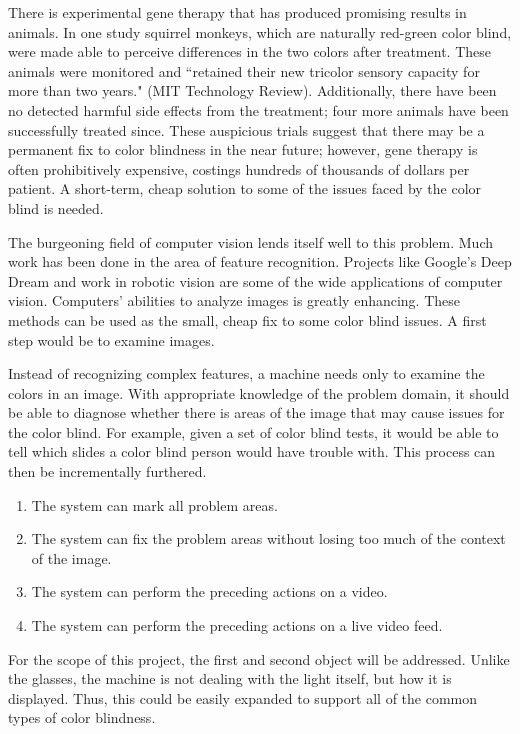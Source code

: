 \documentclass[12pt]{article}
\begin{document}
There is experimental gene therapy that has produced promising results in animals. In one study squirrel monkeys, which are naturally red-green color blind, were made able to perceive differences in the two colors after treatment. These animals were monitored and ``retained their new tricolor sensory capacity for more than two years." (MIT Technology Review). Additionally, there have been no detected harmful side effects from the treatment; four more animals have been successfully treated since. These auspicious trials suggest that there may be a permanent fix to color blindness in the near future; however, gene therapy is often prohibitively expensive, costings hundreds of thousands of dollars per patient. A short-term, cheap solution to some of the issues faced by the color blind is needed. 

The burgeoning field of computer vision lends itself well to this problem. Much work has been done in the area of feature recognition. Projects like Google's Deep Dream and work in robotic vision are some of the wide applications of computer vision. Computers' abilities to analyze images is greatly enhancing. These methods can be used as the small, cheap fix to some color blind issues. A first step would be to examine images.

Instead of recognizing complex features, a machine needs only to examine the colors in an image. With appropriate knowledge of the problem domain, it should be able to diagnose whether there is areas of the image that may cause issues for the color blind. For example, given a set of color blind tests, it would be able to tell which slides a color blind person would have trouble with. This process can then be incrementally furthered.

\singlespacing
\begin{enumerate}
	\item The system can mark all problem areas.
	\item The system can fix the problem areas without losing too much of the context of the image.
	\item The system can perform the preceding actions on a video.
	\item The system can perform the preceding actions on a live video feed.
\end{enumerate}
\doublespacing

For the scope of this project, the first and second object will be addressed. Unlike the glasses, the machine is not dealing with the light itself, but how it is displayed. Thus, this could be easily expanded to support all of the common types of color blindness. 
\end{document}
